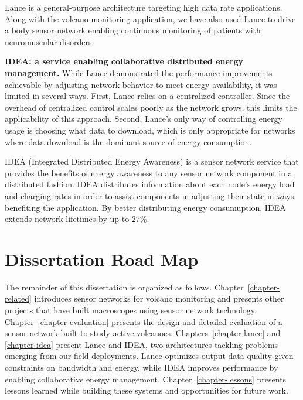 Lance is a general-purpose architecture targeting high data rate
applications. Along with the volcano-monitoring application, we have also
used Lance to drive a body sensor network enabling continuous monitoring of
patients with neuromuscular disorders.

\clearpage

\noindent \textbf{IDEA: a service enabling collaborative distributed energy
management.} While Lance demonstrated the performance improvements achievable
by adjusting network behavior to meet energy availability, it was limited in
several ways. First, Lance relies on a centralized controller. Since the
overhead of centralized control scales poorly as the network grows, this
limits the applicability of this approach. Second, Lance's only way of
controlling energy usage is choosing what data to download, which is only
appropriate for networks where data download is the dominant source of energy
consumption.

IDEA (Integrated Distributed Energy Awareness) is a sensor network service
that provides the benefits of energy awareness to any sensor network
component in a distributed fashion. IDEA distributes information about each
node's energy load and charging rates in order to assist components in
adjusting their state in ways benefiting the application. By better
distributing energy consumuption, IDEA extends network lifetimes by up to
27\%.

\section{Dissertation Road Map}

The remainder of this dissertation is organized as follows.
Chapter~\ref{chapter-related} introduces sensor networks for volcano
monitoring and presents other projects that have built macroscopes using
sensor network technology. Chapter~\ref{chapter-evaluation} presents the
design and detailed evaluation of a sensor network built to study active
volcanoes. Chapters~\ref{chapter-lance} and \ref{chapter-idea} present Lance
and IDEA, two architectures tackling problems emerging from our field
deployments. Lance optimizes output data quality given constraints on
bandwidth and energy, while IDEA improves performance by enabling
collaborative energy management. Chapter~\ref{chapter-lessons} presents
lessons learned while building these systems and opportunities for future
work.
